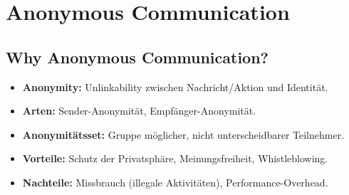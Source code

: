 \section{Anonymous Communication}

\subsection{Why Anonymous Communication?}
\begin{itemize}
    \item \textbf{Anonymity:} Unlinkability zwischen Nachricht/Aktion und Identität.
    \item \textbf{Arten:} Sender-Anonymität, Empfänger-Anonymität.
    \item \textbf{Anonymitätsset:} Gruppe möglicher, nicht unterscheidbarer Teilnehmer.
    \item \textbf{Vorteile:} Schutz der Privatsphäre, Meinungsfreiheit, Whistleblowing.
    \item \textbf{Nachteile:} Missbrauch (illegale Aktivitäten), Performance-Overhead.
\end{itemize}

